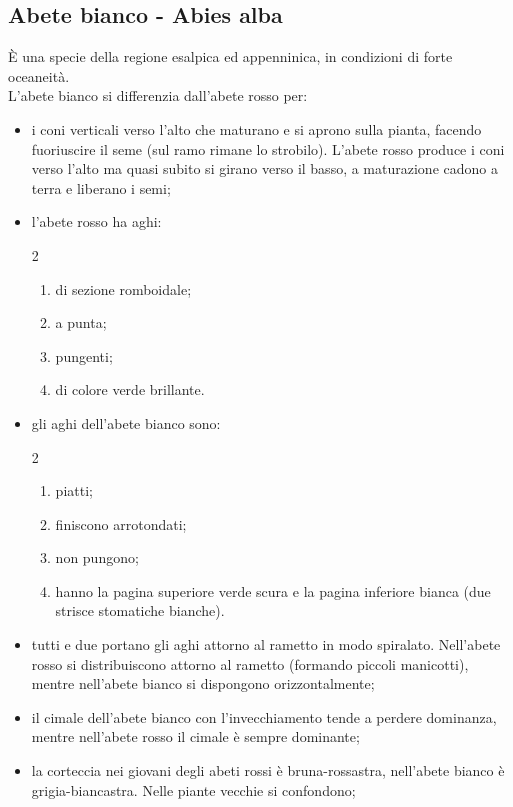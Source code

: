 \subsection{Abete bianco - Abies alba}
È una specie della regione esalpica ed appenninica, in condizioni di forte oceaneità.\\
L'abete bianco si differenzia dall'abete rosso per:
\begin{itemize}[nosep]
    \item i coni verticali verso l'alto che maturano e si aprono sulla pianta, facendo fuoriuscire il seme (sul ramo rimane lo strobilo). L'abete rosso produce i coni verso l'alto ma quasi subito si girano verso il basso, a maturazione cadono a terra e liberano i semi;
    \item l'abete rosso ha aghi:
   \begin{multicols}{2}
        \begin{enumerate}[nosep]
        \item di sezione romboidale; 
        \item a punta;
        \item pungenti;
        \item di colore verde brillante.
    \end{enumerate}
   \end{multicols}
     \item gli aghi dell'abete bianco sono:
\begin{multicols}{2}
    \begin{enumerate}[nosep]
        \item piatti;
        \item finiscono arrotondati;
        \item non pungono;
        \item hanno la pagina superiore verde scura e la pagina inferiore bianca (due strisce stomatiche bianche).
    \end{enumerate}
    \end{multicols}
    \item tutti e due portano gli aghi attorno al rametto in modo spiralato. Nell'abete rosso si distribuiscono attorno al rametto (formando piccoli manicotti), mentre nell'abete bianco si dispongono orizzontalmente;
    \item il cimale dell'abete bianco con l'invecchiamento tende a perdere dominanza, mentre nell'abete rosso il cimale è sempre dominante;
    \item la corteccia nei giovani degli abeti rossi è bruna-rossastra, nell'abete bianco è grigia-biancastra. Nelle piante vecchie si confondono;

\end{itemize}
